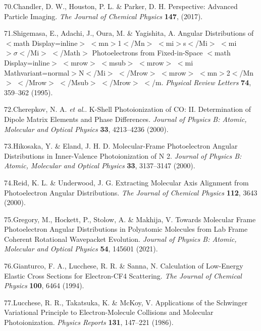 \documentclass[10pt]{article}
\begin{document}
\label{csl:70}70.Chandler, D. W., Houston, P. L. \& Parker, D. H. {Perspective: {{Advanced}} Particle Imaging}. \textit{The Journal of Chemical Physics} \textbf{147}, (2017).

\label{csl:71}71.Shigemasa, E., Adachi, J., Oura, M. \& Yagishita, A. {Angular {{Distributions}} of {$<$}math Display=inline{$>$} {$<$}mn{$>$}1{$<$}/Mn{$>$} {$<$}mi{$>$}s{$<$}/Mi{$>$} {$<$}mi{$>\sigma<$}/Mi{$>$} {$<$}/Math{$>$} {{Photoelectrons}} from {{Fixed}}-in-{{Space}} {$<$}math Display=inline{$>$} {$<$}mrow{$>$} {$<$}msub{$>$} {$<$}mrow{$>$} {$<$}mi Mathvariant=normal{$>$}{{N}}{$<$}/Mi{$>$} {$<$}/Mrow{$>$} {$<$}mrow{$>$} {$<$}mn{$>$}2{$<$}/Mn{$>$} {$<$}/Mrow{$>$} {$<$}/Msub{$>$} {$<$}/Mrow{$>$} {$<$}/m}. \textit{Physical Review Letters} \textbf{74}, 359–362 (1995).

\label{csl:72}72.Cherepkov, N. A. \textit{et al.}. {K-Shell Photoionization of {{CO}}: {{II}}. {{Determination}} of Dipole Matrix Elements and Phase Differences}. \textit{Journal of Physics B: Atomic, Molecular and Optical Physics} \textbf{33}, 4213–4236 (2000).

\label{csl:73}73.Hikosaka, Y. \& Eland, J. H. D. {Molecular-Frame Photoelectron Angular Distributions in Inner-Valence Photoionization of {{N}} 2}. \textit{Journal of Physics B: Atomic, Molecular and Optical Physics} \textbf{33}, 3137–3147 (2000).

\label{csl:74}74.Reid, K. L. \& Underwood, J. G. {Extracting Molecular Axis Alignment from Photoelectron Angular Distributions}. \textit{The Journal of Chemical Physics} \textbf{112}, 3643 (2000).

\label{csl:75}75.Gregory, M., Hockett, P., Stolow, A. \& Makhija, V. {Towards Molecular Frame Photoelectron Angular Distributions in Polyatomic Molecules from Lab Frame Coherent Rotational Wavepacket Evolution}. \textit{Journal of Physics B: Atomic, Molecular and Optical Physics} \textbf{54}, 145601 (2021).

\label{csl:76}76.Gianturco, F. A., Lucchese, R. R. \& Sanna, N. {Calculation of Low-Energy Elastic Cross Sections for Electron-{{CF4}} Scattering}. \textit{The Journal of Chemical Physics} \textbf{100}, 6464 (1994).

\label{csl:77}77.Lucchese, R. R., Takatsuka, K. \& McKoy, V. {Applications of the {{Schwinger}} Variational Principle to Electron-Molecule Collisions and Molecular Photoionization}. \textit{Physics Reports} \textbf{131}, 147–221 (1986).
\end{document}
